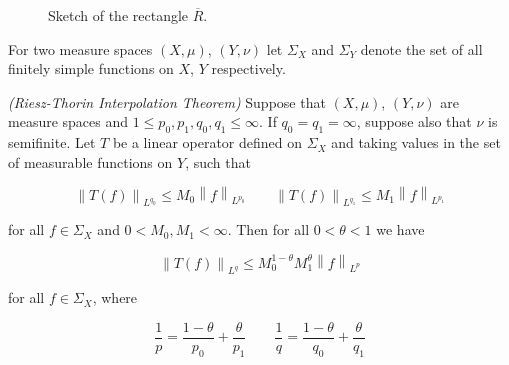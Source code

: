 \begin{figure}[h!tb]
	\centering
	\caption{Sketch of the rectangle $\overline{R}$.}
	\label{fig:Hadamards_three_lines_lemma}
\end{figure}

For two measure spaces $\left( X,\mu \right)$, $\left( Y,\nu \right)$ let $\Sigma_X$ and $\Sigma_Y$ denote the set of all finitely simple functions on $X$, $Y$ respectively.

\vspace{2mm}

\begin{mdframed}
	\begin{theorem*}\emph{(Riesz-Thorin Interpolation Theorem)}
		Suppose that $(X,\mu)$, $(Y,\nu)$ are measure spaces and $1 \leqslant p_0,p_1,q_0,q_1 \leqslant \infty$. If $q_0 = q_1 = \infty$, suppose also that $\nu$ is semifinite. Let $T$ be a linear operator defined on $\Sigma_X$ and taking values in the set of measurable functions on $Y$, such that

		\begin{equation}
			\left\|T(f)\right\|_{L^{q_0}} \leqslant M_0\left\|f\right\|_{L^{p_0}} \qquad \left\|T(f)\right\|_{L^{q_1}} \leqslant M_1\left\|f\right\|_{L^{p_1}}
			\label{hyp:Lq0Lq1}
		\end{equation}

		for all $f \in \Sigma_X$ and $0 < M_0,M_1 < \infty$. Then for all $0 < \theta < 1$ we have

		\begin{equation}
			\left\|T(f)\right\|_{L^q} \leqslant M_0^{1 - \theta}M_1^\theta\left\|f\right\|_{L^p}
			\label{est:boundTf}
		\end{equation}

		for all $f \in \Sigma_X$, where

		\begin{equation*}
			\frac{1}{p} = \frac{1 - \theta}{p_0} + \frac{\theta}{p_1} \qquad \frac{1}{q} = \frac{1 - \theta}{q_0} + \frac{\theta}{q_1}
		\end{equation*}
		\label{thm:Riesz_Thorin}
	\end{theorem*}
\end{mdframed}

